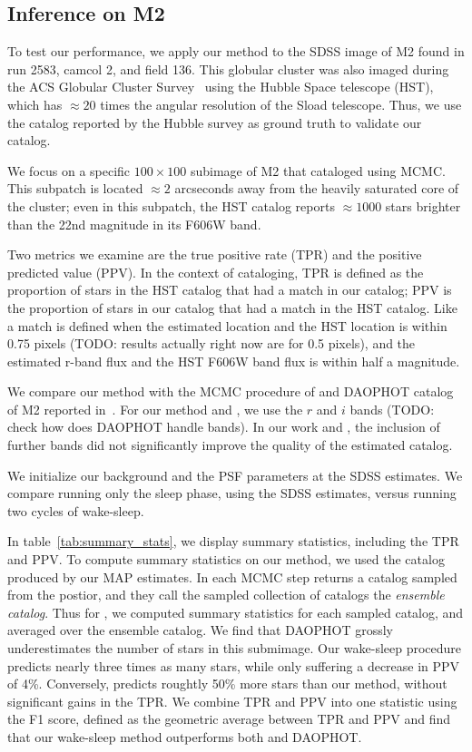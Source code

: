 \subsection{Inference on M2}
To test our performance, we apply our method to the SDSS image of M2 found in run 2583, camcol 2, and field 136.
This globular cluster was also imaged during the ACS Globular Cluster Survey~\cite{Sarajedini_2007}
using the Hubble Space telescope (HST),
which has $\approx20$ times the angular resolution of the Sload telescope.
Thus, we use the catalog reported by the Hubble survey as ground truth to validate our catalog.

We focus on a specific $100 \times 100$ subimage of M2 that \cite{Portillo_2017, Feder_2019} cataloged using MCMC.
This subpatch is located $\approx2$ arcseconds away from the heavily saturated core of the cluster;
even in this subpatch, the HST catalog reports $\approx 1000$ stars brighter than the 22nd magnitude in its F606W band.

Two metrics we examine are the true positive rate (TPR) and the positive predicted value (PPV).
In the context of cataloging, TPR is defined as the proportion of stars in the HST catalog that had a match in our catalog;
PPV is the proportion of stars in our catalog that had a match in the HST catalog.
Like \cite{Portillo_2017, Feder_2019} a match is defined when the estimated location and the HST location is within 0.75 pixels
(TODO: results actually right now are for 0.5 pixels),
and the estimated r-band flux and the HST F606W band flux is within half a magnitude.

We compare our method with the MCMC procedure of \cite{Feder_2019} and DAOPHOT catalog of M2 reported in~\cite{An_2008_m2}.
For our method and \cite{Feder_2019}, we use the $r$ and $i$ bands (TODO: check how does DAOPHOT handle bands).
In our work and \cite{Feder_2019}, the inclusion of further bands did not significantly improve the quality of
the estimated catalog.

We initialize our background and the PSF parameters at the SDSS estimates.
We compare running only the sleep phase, using the SDSS estimates, versus running two cycles of wake-sleep.

In table~\ref{tab:summary_stats}, we display summary statistics, including the TPR and PPV.
To compute summary statistics on our method, we used the catalog produced by our MAP estimates.
In \cite{Feder_2019} each MCMC step returns a catalog sampled from the postior,
and they call the sampled collection of catalogs the  {\itshape ensemble catalog}.
Thus for \cite{Feder_2019}, we computed summary statistics for each sampled catalog,
and averaged over the ensemble catalog.
We find that DAOPHOT grossly underestimates the number of stars in this submimage.
Our wake-sleep procedure predicts nearly three times as many stars, while only suffering a decrease in PPV of 4\%.
Conversely, \cite{Feder_2019} predicts roughtly 50\% more stars than our method, without significant gains in the TPR.
We combine TPR and PPV into one statistic using the F1 score,
defined as the geometric average between TPR and PPV and find that our wake-sleep method outperforms both \cite{Feder_2019}
and DAOPHOT.

